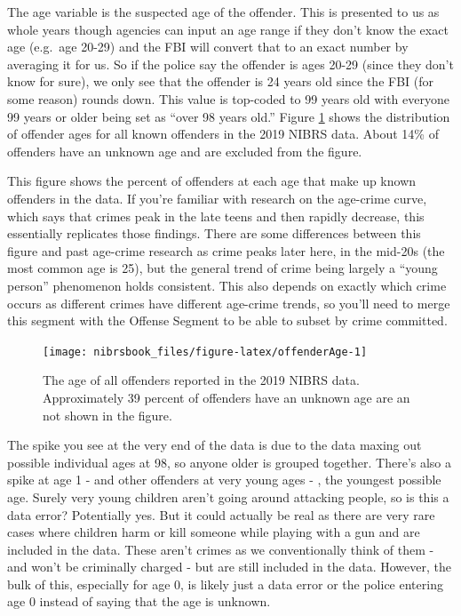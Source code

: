 \documentclass[
  12pt,
  openany]{book}
\begin{document}
The age variable is the suspected age of the offender. This is presented to us as whole years though agencies can input an age range if they don't know the exact age (e.g.~age 20-29) and the FBI will convert that to an exact number by averaging it for us. So if the police say the offender is ages 20-29 (since they don't know for sure), we only see that the offender is 24 years old since the FBI (for some reason) rounds down. This value is top-coded to 99 years old with everyone 99 years or older being set as ``over 98 years old.'' Figure \ref{fig:offenderAge} shows the distribution of offender ages for all known offenders in the 2019 NIBRS data. About 14\% of offenders have an unknown age and are excluded from the figure.

This figure shows the percent of offenders at each age that make up known offenders in the data. If you're familiar with research on the age-crime curve, which says that crimes peak in the late teens and then rapidly decrease, this essentially replicates those findings. There are some differences between this figure and past age-crime research as crime peaks later here, in the mid-20s (the most common age is 25), but the general trend of crime being largely a ``young person'' phenomenon holds consistent. This also depends on exactly which crime occurs as different crimes have different age-crime trends, so you'll need to merge this segment with the Offense Segment to be able to subset by crime committed.

\begin{figure}

{\centering \texttt{[image: nibrsbook\_files/figure-latex/offenderAge-1]} 

}

\caption{The age of all offenders reported in the 2019 NIBRS data. Approximately 39 percent of offenders have an unknown age are an not shown in the figure.}\label{fig:offenderAge}
\end{figure}

The spike you see at the very end of the data is due to the data maxing out possible individual ages at 98, so anyone older is grouped together. There's also a spike at age 1 - and other offenders at very young ages - , the youngest possible age. Surely very young children aren't going around attacking people, so is this a data error? Potentially yes. But it could actually be real as there are very rare cases where children harm or kill someone while playing with a gun and are included in the data. These aren't crimes as we conventionally think of them - and won't be criminally charged - but are still included in the data. However, the bulk of this, especially for age 0, is likely just a data error or the police entering age 0 instead of saying that the age is unknown.
\end{document}
